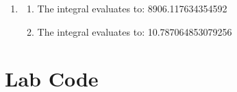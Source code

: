 \documentclass[a4paper,11pt]{article}
\begin{document}
\begin{preview}
\begin{enumerate}
\begin{enumerate}
\item 
\begin{enumerate}
    \item The integral evaluates to: 8906.117634354592
    \item The integral evaluates to: 10.787064853079256
\end{enumerate}

\end{enumerate}

\end{enumerate}

\section*{Lab Code}


\end{preview}
\end{document}
